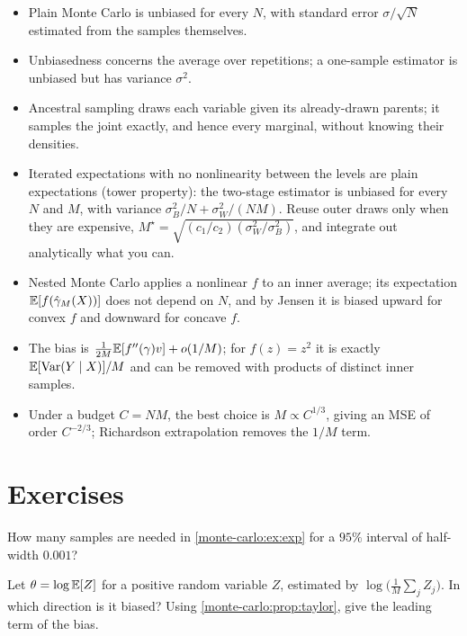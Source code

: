 \begin{notechapter}
\begin{chaptersummary}
\begin{itemize}[nosep]
  \item Plain Monte Carlo is unbiased for every $N$, with standard error
        $\sigma/\sqrt N$ estimated from the samples themselves.
  \item Unbiasedness concerns the average over repetitions; a one-sample
        estimator is unbiased but has variance $\sigma^2$.
  \item Ancestral sampling draws each variable given its already-drawn parents;
        it samples the joint exactly, and hence every marginal, without knowing
        their densities.
  \item Iterated expectations with no nonlinearity between the levels are plain
        expectations (tower property): the two-stage estimator is unbiased for every
        $N$ and $M$, with variance $\sigma_B^2/N + \sigma_W^2/(NM)$. Reuse outer draws only
        when they are expensive, $M^\star = \sqrt{(c_1/c_2)(\sigma_W^2/\sigma_B^2)}$, and integrate
        out analytically what you can.
  \item Nested Monte Carlo applies a nonlinear $f$ to an inner average; its
        expectation $\mathbb{E}[f(\hat\gamma_M(X))]$ does not depend on $N$, and by
        Jensen it is biased upward for convex $f$ and downward for concave $f$.
  \item The bias is $\frac1{2M}\mathbb{E}[f''(\gamma)v]+o(1/M)$; for $f(z) = z^2$ it is exactly
        $\mathbb{E}[\operatorname{Var}(Y\mid X)]/M$ and can be removed with products of distinct inner
        samples.
  \item Under a budget $C = NM$, the best choice is $M\propto C^{1/3}$, giving an
        MSE of order $C^{-2/3}$; Richardson extrapolation removes the $1/M$ term.
\end{itemize}
\end{chaptersummary}

\section*{Exercises}

\begin{exercise}\label{monte-carlo:exr:1}
How many samples are needed in \cref{monte-carlo:ex:exp} for a $95\%$ interval of
half-width $0.001$?
\end{exercise}

\begin{exercise}\label{monte-carlo:exr:2}
Let $\theta = \log\mathbb{E}[Z]$ for a positive random variable $Z$, estimated by
$\log\bigl(\frac1M\sum_jZ_j\bigr)$. In which direction is it biased? Using
\cref{monte-carlo:prop:taylor}, give the leading term of the bias.
\end{exercise}


\end{notechapter}
